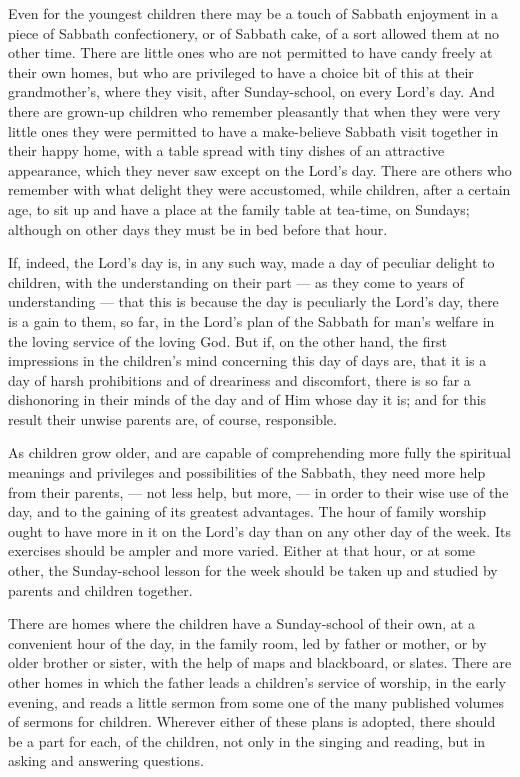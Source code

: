\documentclass[
]{book}
\begin{document}
Even for the youngest children there may be a touch of Sabbath enjoyment in a piece of Sabbath confectionery, or of Sabbath cake, of a sort allowed them at no other time. There are little ones who are not permitted to have candy freely at their own homes, but who are privileged to have a choice bit of this at their grandmother's, where they visit, after Sunday-school, on every Lord's day. And there are grown-up children who remember pleasantly that when they were very little ones they were permitted to have a make-believe Sabbath visit together in their happy home, with a table spread with tiny dishes of an attractive appearance, which they never saw except on the Lord's day. There are others who remember with what delight they were accustomed, while children, after a certain age, to sit up and have a place at the family table at tea-time, on Sundays; although on other days they must be in bed before that hour.

If, indeed, the Lord's day is, in any such way, made a day of peculiar delight to children, with the understanding on their part --- as they come to years of understanding --- that this is because the day is peculiarly the Lord's day, there is a gain to them, so far, in the Lord's plan of the Sabbath for man's welfare in the loving service of the loving God. But if, on the other hand, the first impressions in the children's mind concerning this day of days are, that it is a day of harsh prohibitions and of dreariness and discomfort, there is so far a dishonoring in their minds of the day and of Him whose day it is; and for this result their unwise parents are, of course, responsible.

As children grow older, and are capable of comprehending more fully the spiritual meanings and privileges and possibilities of the Sabbath, they need more help from their parents, --- not less help, but more, --- in order to their wise use of the day, and to the gaining of its greatest advantages. The hour of family worship ought to have more in it on the Lord's day than on any other day of the week. Its exercises should be ampler and more varied. Either at that hour, or at some other, the Sunday-school lesson for the week should be taken up and studied by parents and children together.

There are homes where the children have a Sunday-school of their own, at a convenient hour of the day, in the family room, led by father or mother, or by older brother or sister, with the help of maps and blackboard, or slates. There are other homes in which the father leads a children's service of worship, in the early evening, and reads a little sermon from some one of the many published volumes of sermons for children. Wherever either of these plans is adopted, there should be a part for each, of the children, not only in the singing and reading, but in asking and answering questions.
\end{document}

